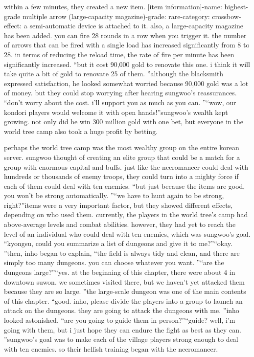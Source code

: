 within a few minutes, they created a new item.
[item information]-name: highest-grade multiple arrow (large-capacity magazine)-grade: rare-category: crossbow-effect: a semi-automatic device is attached to it.
 also, a large-capacity magazine has been added.
 you can fire 28 rounds in a row when you trigger it.
the number of arrows that can be fired with a single load has increased significantly from 8 to 28.
 in terms of reducing the reload time, the rate of fire per minute has been significantly increased.
“but it cost 90,000 gold to renovate this one.
 i think it will take quite a bit of gold to renovate 25 of them.
”although the blacksmith expressed satisfaction, he looked somewhat worried because 90,000 gold was a lot of money.
but they could stop worrying after hearing sungwoo’s reassurances.
“don’t worry about the cost.
 i’ll support you as much as you can.
”“wow, our kondori players would welcome it with open hands!”sungwoo’s wealth kept growing.
 not only did he win 300 million gold with one bet, but everyone in the world tree camp also took a huge profit by betting.


perhaps the world tree camp was the most wealthy group on the entire korean server.
sungwoo thought of creating an elite group that could be a match for a group with enormous capital and buffs.
just like the necromancer could deal with hundreds or thousands of enemy troops, they could turn into a mighty force if each of them could deal with ten enemies.
“but just because the items are good, you won’t be strong automatically.
”“we have to hunt again to be strong, right?”items were a very important factor, but they showed different effects, depending on who used them.
currently, the players in the world tree’s camp had above-average levels and combat abilities.
 however, they had yet to reach the level of an individual who could deal with ten enemies, which was sungwoo’s goal.
“kyongsu, could you summarize a list of dungeons and give it to me?”“okay.
”then, inho began to explain, “the field is always tidy and clean, and there are simply too many dungeons.
 you can choose whatever you want.
”“are the dungeons large?”“yes.
 at the beginning of this chapter, there were about 4 in downtown suwon.
 we sometimes visited there, but we haven’t yet attacked them because they are so large.
”the large-scale dungeon was one of the main contents of this chapter.
“good.
 inho, please divide the players into a group to launch an attack on the dungeons.
 they are going to attack the dungeons with me.
”inho looked astonished.
“are you going to guide them in person?”“guide? well, i’m going with them, but i just hope they can endure the fight as best as they can.
”sungwoo’s goal was to make each of the village players strong enough to deal with ten enemies.
 so their hellish training began with the necromancer.


 